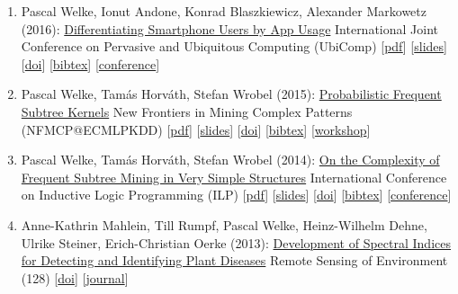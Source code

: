 \documentclass{scrartcl}
\begin{document}
\begin{enumerate}
{[\href{https://dx.doi.org/10.1007/978-3-319-46307-0_30}{doi}]
[\href{https://dblp.org/rec/conf/dis/UllrichMW16.bib}{bibtex}]
[\href{http://ds2016.di.uniba.it/}{conference}]
}
\item
\label{welke2016ubicomp}
Pascal Welke, Ionut Andone, Konrad Blaszkiewicz, Alexander Markowetz (2016):\newline
\href{https://dx.doi.org/10.1145/2971648.2971707}{Differentiating Smartphone Users by App Usage}\newline
International Joint Conference on Pervasive
and Ubiquitous Computing (UbiComp)\newline
{\footnotesize
[\href{https://pwelke.github.io/publications/welke2016ubicomp.pdf}{pdf}]
[\href{https://pwelke.github.io/publications/welke2016ubicomp-slides.pdf}{slides}]
[\href{https://dx.doi.org/10.1145/2971648.2971707}{doi}]
[\href{https://dblp.org/rec/conf/huc/WelkeABM16.bib}{bibtex}]
[\href{http://ubicomp.org/ubicomp2016/}{conference}]
}
\item
\label{welke2015nfmcp}
Pascal Welke, Tamás Horváth, Stefan Wrobel (2015):\newline
\href{https://dx.doi.org/10.1007/978-3-319-39315-5_12}{Probabilistic Frequent Subtree Kernels}\newline
New Frontiers in Mining Complex Patterns (NFMCP@ECMLPKDD)\newline
{\footnotesize
[\href{https://pwelke.github.io/publications/welke2015nfmcp.pdf}{pdf}]
[\href{https://pwelke.github.io/publications/welke2015nfmcp-slides.pdf}{slides}]
[\href{https://dx.doi.org/10.1007/978-3-319-39315-5_12}{doi}]
[\href{https://dblp.org/rec/conf/pkdd/WelkeHW15.bib}{bibtex}]
[\href{http://www.di.uniba.it/~loglisci/nfMCP15/}{workshop}]
}
\item
\label{welke2014ilp}
Pascal Welke, Tamás Horváth, Stefan Wrobel (2014):\newline
\href{https://dx.doi.org/10.1007/978-3-319-23708-4_14}{On the Complexity of Frequent Subtree Mining in Very Simple Structures}\newline
International Conference on Inductive Logic Programming (ILP)\newline
{\footnotesize
[\href{https://pwelke.github.io/publications/welke2014ilp.pdf}{pdf}]
[\href{https://pwelke.github.io/publications/welke2014ilp-slides.pdf}{slides}]
[\href{https://dx.doi.org/10.1007/978-3-319-23708-4_14}{doi}]
[\href{https://dblp.org/rec/conf/ilp/WelkeHW14.bib}{bibtex}]
[\href{https://dtai.cs.kuleuven.be/events/ilp2014/}{conference}]
}
\item
\label{mahlein2013development}
Anne-Kathrin Mahlein, Till Rumpf, Pascal Welke, Heinz-Wilhelm Dehne, Ulrike Steiner, Erich-Christian Oerke (2013):\newline
\href{https://dx.doi.org/10.1016/j.rse.2012.09.019}{Development of Spectral Indices for Detecting and Identifying Plant Diseases}\newline
Remote Sensing of Environment (128)\newline
{\footnotesize
[\href{https://dx.doi.org/10.1016/j.rse.2012.09.019}{doi}]
[\href{https://www.journals.elsevier.com/remote-sensing-of-environment}{journal}]
}
\seti
\end{enumerate}
\end{document}

